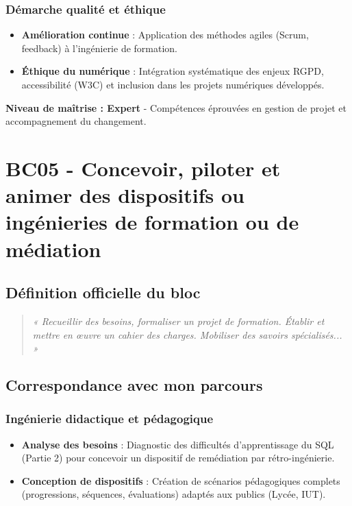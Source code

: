 \subsubsection{Démarche qualité et éthique}
\begin{itemize}[leftmargin=*]
    \item \textbf{Amélioration continue} : Application des méthodes agiles (Scrum, feedback) à l'ingénierie de formation.
    \item \textbf{Éthique du numérique} : Intégration systématique des enjeux RGPD, accessibilité (W3C) et inclusion dans les projets numériques développés.
\end{itemize}

\textbf{Niveau de maîtrise : Expert} - Compétences éprouvées en gestion de projet et accompagnement du changement.

\vspace{1cm}

\section{BC05 - Concevoir, piloter et animer des dispositifs ou ingénieries de formation ou de médiation}

\subsection{Définition officielle du bloc}
\begin{quote}
\textit{« Recueillir des besoins, formaliser un projet de formation. Établir et mettre en œuvre un cahier des charges. Mobiliser des savoirs spécialisés... »} \parencite{rncp38152}
\end{quote}

\subsection{Correspondance avec mon parcours}

\subsubsection{Ingénierie didactique et pédagogique}
\begin{itemize}[leftmargin=*]
    \item \textbf{Analyse des besoins} : Diagnostic des difficultés d'apprentissage du SQL (Partie 2) pour concevoir un dispositif de remédiation par rétro-ingénierie.
    \item \textbf{Conception de dispositifs} : Création de scénarios pédagogiques complets (progressions, séquences, évaluations) adaptés aux publics (Lycée, IUT).
\end{itemize}

